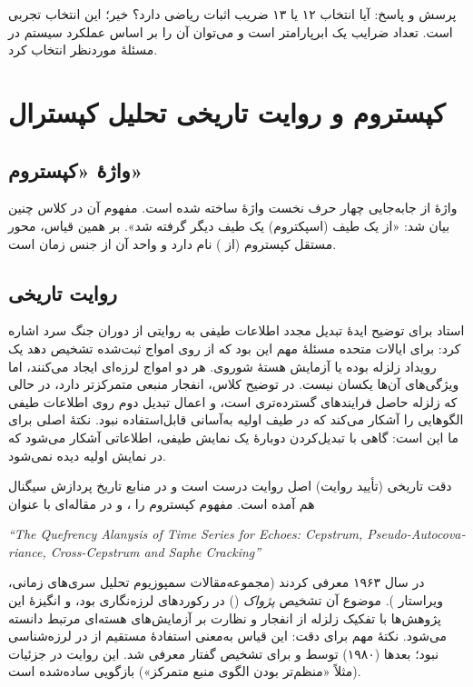 \begin{exambox}{پرسش و پاسخ: آیا انتخاب ۱۲ یا ۱۳ ضریب اثبات ریاضی دارد؟}
خیر؛ این انتخاب تجربی است. تعداد ضرایب یک ابرپارامتر است و می‌توان آن را بر اساس عملکرد سیستم در مسئلهٔ موردنظر انتخاب کرد.
\end{exambox}

\section{کپستروم و روایت تاریخی تحلیل کپسترال}

\subsection{واژهٔ «کپستروم»}
واژهٔ  از جابه‌جایی چهار حرف نخست واژهٔ  ساخته شده است. مفهوم آن در کلاس چنین بیان شد: «از یک طیف (اسپکتروم) یک طیف دیگر گرفته شد». بر همین قیاس، محور مستقل کپستروم  (از ) نام دارد و واحد آن از جنس زمان است.

\subsection{روایت تاریخی}
استاد برای توضیح ایدهٔ تبدیل مجدد اطلاعات طیفی به روایتی از دوران جنگ سرد اشاره کرد: برای ایالات متحده مسئلهٔ مهم این بود که از روی امواج ثبت‌شده تشخیص دهد یک رویداد زلزله بوده یا آزمایش هستهٔ شوروی. هر دو امواج لرزه‌ای ایجاد می‌کنند، اما ویژگی‌های آن‌ها یکسان نیست. در توضیح کلاس، انفجار منبعی متمرکزتر دارد، در حالی که زلزله حاصل فرایندهای گسترده‌تری است، و اعمال تبدیل دوم روی اطلاعات طیفی الگوهایی را آشکار می‌کند که در طیف اولیه به‌آسانی قابل‌استفاده نبود. نکتهٔ اصلی برای ما این است: گاهی با تبدیل‌کردن دوبارهٔ یک نمایش طیفی، اطلاعاتی آشکار می‌شود که در نمایش اولیه دیده نمی‌شود.

\begin{correctionbox}{دقت تاریخی (تأیید روایت)}
اصل روایت درست است و در منابع تاریخ پردازش سیگنال هم آمده است. مفهوم کپستروم را ،  و  در مقاله‌ای با عنوان
\begin{latin}
\noindent\textit{``The Quefrency Alanysis of Time Series for Echoes: Cepstrum, Pseudo-Autocovariance, Cross-Cepstrum and Saphe Cracking''}
\end{latin}
در سال ۱۹۶۳ معرفی کردند (مجموعه‌مقالات سمپوزیوم تحلیل سری‌های زمانی، ویراستار ). موضوع آن تشخیص \emph{پژواک} () در رکوردهای لرزه‌نگاری بود، و انگیزهٔ این پژوهش‌ها با تفکیک زلزله از انفجار و نظارت بر آزمایش‌های هسته‌ای مرتبط دانسته می‌شود. نکتهٔ مهم برای دقت: این قیاس به‌معنی استفادهٔ مستقیم از  در لرزه‌شناسی نبود؛  بعدها (۱۹۸۰) توسط  و  برای تشخیص گفتار معرفی شد. این روایت در جزئیات (مثلاً «منظم‌تر بودن الگوی منبع متمرکز») بازگویی ساده‌شده است.
\end{correctionbox}

